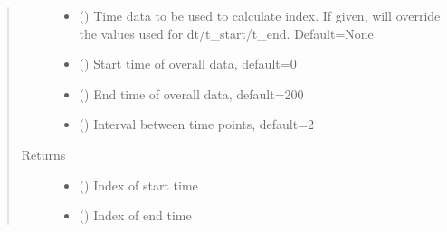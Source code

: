 \documentclass[letterpaper,10pt,english]{sphinxmanual}
\begin{document}
\begin{fulllineitems}
\begin{quote}
\begin{description}
\begin{itemize}
\item {} 
\sphinxAtStartPar
{} (\sphinxstyleliteralemphasis{\sphinxupquote{, }}) \textendash{} Time data to be used to calculate index. If given, will over\sphinxhyphen{}ride the values used for dt/t\_start/t\_end.
Default=None

\item {} 
\sphinxAtStartPar
{} (\sphinxstyleliteralemphasis{\sphinxupquote{, }}) \textendash{} Start time of overall data, default=0

\item {} 
\sphinxAtStartPar
{} (\sphinxstyleliteralemphasis{\sphinxupquote{, }}) \textendash{} End time of overall data, default=200

\item {} 
\sphinxAtStartPar
{} (\sphinxstyleliteralemphasis{\sphinxupquote{, }}) \textendash{} Interval between time points, default=2

\end{itemize}

\item[{Returns}] \leavevmode
\sphinxAtStartPar
\begin{itemize}
\item {} 
\sphinxAtStartPar
{} () \textendash{} Index of start time

\item {} 
\sphinxAtStartPar
{} () \textendash{} Index of end time

\end{itemize}


\end{description}\end{quote}

\end{fulllineitems}
\end{document}
